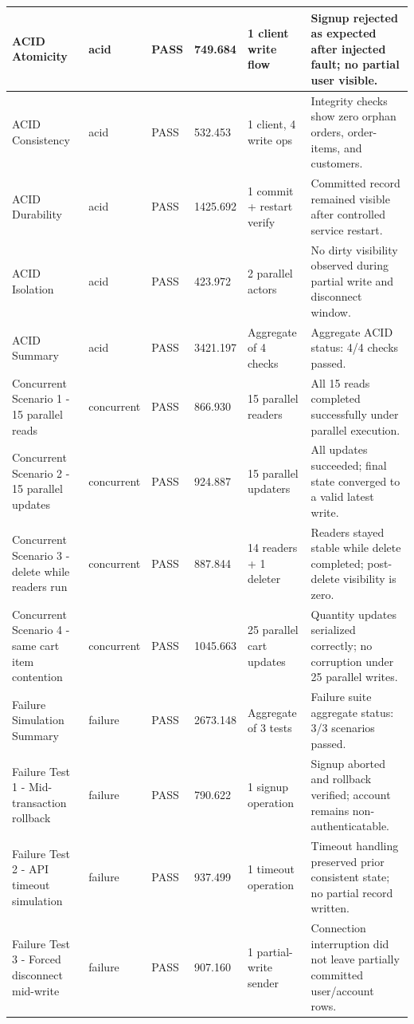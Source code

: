 \documentclass[a4paper, 11pt]{article}
\begin{document}
\begin{longtable}{|p{3.8cm}|p{1.4cm}|p{1.3cm}|p{1.7cm}|p{2.8cm}|p{4.6cm}|}
ACID Atomicity & acid & PASS & 749.684 & 1 client write flow & Signup rejected as expected after injected fault; no partial user visible. \\ \hline
ACID Consistency & acid & PASS & 532.453 & 1 client, 4 write ops & Integrity checks show zero orphan orders, order-items, and customers. \\ \hline
ACID Durability & acid & PASS & 1425.692 & 1 commit + restart verify & Committed record remained visible after controlled service restart. \\ \hline
ACID Isolation & acid & PASS & 423.972 & 2 parallel actors & No dirty visibility observed during partial write and disconnect window. \\ \hline
ACID Summary & acid & PASS & 3421.197 & Aggregate of 4 checks & Aggregate ACID status: 4/4 checks passed. \\ \hline
Concurrent Scenario 1 - 15 parallel reads & concurrent & PASS & 866.930 & 15 parallel readers & All 15 reads completed successfully under parallel execution. \\ \hline
Concurrent Scenario 2 - 15 parallel updates & concurrent & PASS & 924.887 & 15 parallel updaters & All updates succeeded; final state converged to a valid latest write. \\ \hline
Concurrent Scenario 3 - delete while readers run & concurrent & PASS & 887.844 & 14 readers + 1 deleter & Readers stayed stable while delete completed; post-delete visibility is zero. \\ \hline
Concurrent Scenario 4 - same cart item contention & concurrent & PASS & 1045.663 & 25 parallel cart updates & Quantity updates serialized correctly; no corruption under 25 parallel writes. \\ \hline
Failure Simulation Summary & failure & PASS & 2673.148 & Aggregate of 3 tests & Failure suite aggregate status: 3/3 scenarios passed. \\ \hline
Failure Test 1 - Mid-transaction rollback & failure & PASS & 790.622 & 1 signup operation & Signup aborted and rollback verified; account remains non-authenticatable. \\ \hline
Failure Test 2 - API timeout simulation & failure & PASS & 937.499 & 1 timeout operation & Timeout handling preserved prior consistent state; no partial record written. \\ \hline
Failure Test 3 - Forced disconnect mid-write & failure & PASS & 907.160 & 1 partial-write sender & Connection interruption did not leave partially committed user/account rows. \\ \hline

\end{longtable}
\end{document}
